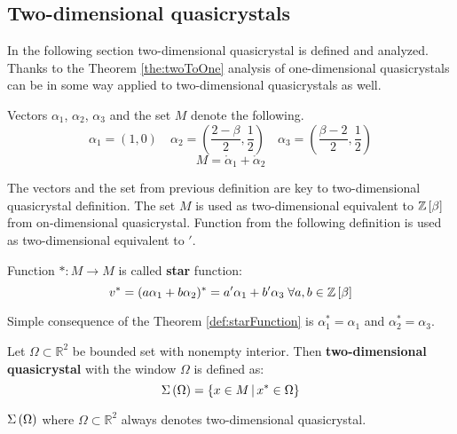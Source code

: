 \documentclass[text.tex]{subfiles}
\begin{document}
\subsection{Two-dimensional quasicrystals}%
\label{sec:twoDimension}
In the following section two-dimensional quasicrystal is defined and analyzed. Thanks to the Theorem \ref{the:twoToOne} analysis of one-dimensional quasicrystals can be in some way applied to two-dimensional quasicrystals as well. 
\begin{definition}
Vectors $\alpha_1$, $\alpha_2$, $\alpha_3$ and the set $M$ denote the following.
$$\alpha_1 = \left( 1,0 \right) \quad \alpha_2 = \left( \frac{2-\beta}{2}, \frac{1}{2} \right) \quad \alpha_3 = \left( \frac{\beta-2}{2}, \frac{1}{2} \right)$$
$$M = \ring\alpha_1 + \ring\alpha_2$$
\end{definition}

\begin{remark}
The vectors and the set from previous definition are key to two-dimensional quasicrystal definition. The set $M$ is used as two-dimensional equivalent to $\mathbb{Z}\left[\beta\right]$ from on-dimensional quasicrystal. Function from the following definition is used as two-dimensional equivalent to $'$.
\end{remark}

\begin{definition}
\label{def:starFunction}
Function $\ast: M \to M$ is called \textbf{star} function:
$$v^\ast = (a\alpha_1 + b\alpha_2)^\ast = a'\alpha_1 + b'\alpha_3 \;\forall a,b\in\mathbb{Z}\left[\beta\right]$$
\end{definition}

\begin{remark}
Simple consequence of the Theorem \ref{def:starFunction} is $\alpha_1^\ast = \alpha_1$ and $\alpha_2^\ast = \alpha_3$.
\end{remark}

\begin{definition}
Let $\Omega \subset \mathbb{R}^2$ be bounded set with nonempty interior. Then \textbf{two-dimensional quasicrystal} with the window $\Omega$ is defined as:
$$\Sigma\left(\Omega\right) = \left\{ x \in M\,|\,x^\ast \in \Omega \right\}$$
\end{definition}

\begin{remark}
$\Sigma\left(\Omega\right)$ where $\Omega \subset \mathbb{R}^2$ always denotes two-dimensional quasicrystal.
\end{remark}
\end{document}
